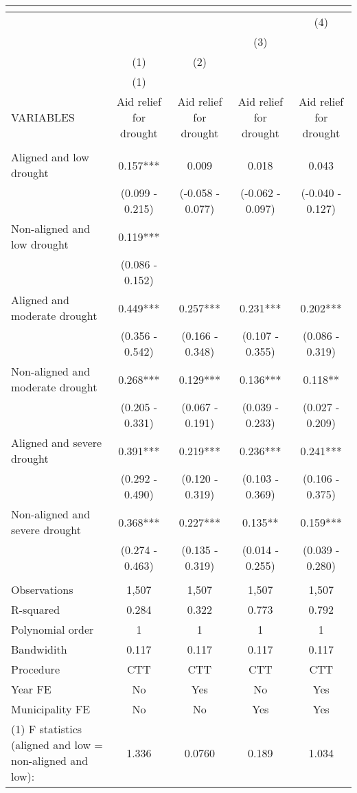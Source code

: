 \begin{tabular}{lcccc}
\multicolumn{5}{c}{} \\ \hline
 &  &  &  & (4) \\
 &  &  & (3) &  \\
 & (1) & (2) &  &  \\
 & (1) &  &  &  \\
VARIABLES & Aid relief for drought & Aid relief for drought & Aid relief for drought & Aid relief for drought \\ \hline
 &  &  &  &  \\
Aligned and low drought & 0.157*** & 0.009 & 0.018 & 0.043 \\
 & (0.099 - 0.215) & (-0.058 - 0.077) & (-0.062 - 0.097) & (-0.040 - 0.127) \\
Non-aligned and low drought & 0.119*** &  &  &  \\
 & (0.086 - 0.152) &  &  &  \\
Aligned and moderate drought & 0.449*** & 0.257*** & 0.231*** & 0.202*** \\
 & (0.356 - 0.542) & (0.166 - 0.348) & (0.107 - 0.355) & (0.086 - 0.319) \\
Non-aligned and moderate drought & 0.268*** & 0.129*** & 0.136*** & 0.118** \\
 & (0.205 - 0.331) & (0.067 - 0.191) & (0.039 - 0.233) & (0.027 - 0.209) \\
Aligned and severe drought & 0.391*** & 0.219*** & 0.236*** & 0.241*** \\
 & (0.292 - 0.490) & (0.120 - 0.319) & (0.103 - 0.369) & (0.106 - 0.375) \\
Non-aligned and severe drought & 0.368*** & 0.227*** & 0.135** & 0.159*** \\
 & (0.274 - 0.463) & (0.135 - 0.319) & (0.014 - 0.255) & (0.039 - 0.280) \\
 &  &  &  &  \\
Observations & 1,507 & 1,507 & 1,507 & 1,507 \\
R-squared & 0.284 & 0.322 & 0.773 & 0.792 \\
Polynomial order & 1 & 1 & 1 & 1 \\
Bandwidith & 0.117 & 0.117 & 0.117 & 0.117 \\
Procedure & CTT & CTT & CTT & CTT \\
Year FE & No & Yes & No & Yes \\
Municipality FE & No & No & Yes & Yes \\
(1) F statistics (aligned and low = non-aligned and low): & 1.336 & 0.0760 & 0.189 & 1.034 \\

\end{tabular}
